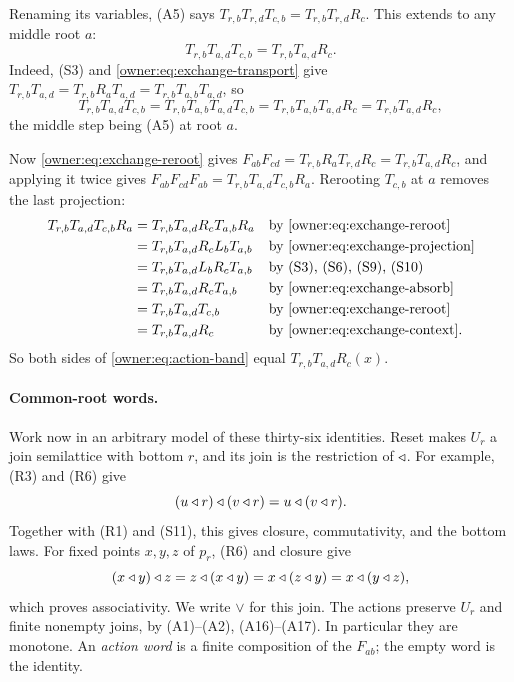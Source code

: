 Renaming its variables, (A5) says $T_{r,b}T_{r,d}T_{c,b}=T_{r,b}T_{r,d}R_c$.
This extends to any middle root $a$:
\begin{equation}\label{owner:eq:exchange-context}
 T_{r,b}T_{a,d}T_{c,b}=T_{r,b}T_{a,d}R_c.
\end{equation}
Indeed, (S3) and \eqref{owner:eq:exchange-transport} give
$T_{r,b}T_{a,d}=T_{r,b}R_aT_{a,d}=T_{r,b}T_{a,b}T_{a,d}$, so
\[
 T_{r,b}T_{a,d}T_{c,b}=T_{r,b}T_{a,b}T_{a,d}T_{c,b}
 =T_{r,b}T_{a,b}T_{a,d}R_c=T_{r,b}T_{a,d}R_c,
\]
the middle step being (A5) at root $a$.

Now \eqref{owner:eq:exchange-reroot} gives
$F_{ab}F_{cd}=T_{r,b}R_aT_{r,d}R_c=T_{r,b}T_{a,d}R_c$, and applying it
twice gives $F_{ab}F_{cd}F_{ab}=T_{r,b}T_{a,d}T_{c,b}R_a$. Rerooting
$T_{c,b}$ at $a$ removes the last projection:
\begin{align*}
 T_{r,b}T_{a,d}T_{c,b}R_a
 &=T_{r,b}T_{a,d}R_cT_{a,b}R_a
  &&\text{by \eqref{owner:eq:exchange-reroot}}\\
 &=T_{r,b}T_{a,d}R_cL_bT_{a,b}
  &&\text{by \eqref{owner:eq:exchange-projection}}\\
 &=T_{r,b}T_{a,d}L_bR_cT_{a,b}
  &&\text{by (S3), (S6), (S9), (S10)}\\
 &=T_{r,b}T_{a,d}R_cT_{a,b}
  &&\text{by \eqref{owner:eq:exchange-absorb}}\\
 &=T_{r,b}T_{a,d}T_{c,b}
  &&\text{by \eqref{owner:eq:exchange-reroot}}\\
 &=T_{r,b}T_{a,d}R_c
  &&\text{by \eqref{owner:eq:exchange-context}}.
\end{align*}
So both sides of \eqref{owner:eq:action-band} equal
$T_{r,b}T_{a,d}R_c(x)$.

\paragraph{Common-root words.}
Work now in an arbitrary model of these thirty-six identities.
Reset makes $U_r$ a join semilattice with bottom $r$, and its join
is the restriction of $\mathbin{\triangleleft}$. For example, (R3) and (R6) give
\[
 (u\mathbin{\triangleleft} r)\mathbin{\triangleleft}(v\mathbin{\triangleleft} r)=u\mathbin{\triangleleft}(v\mathbin{\triangleleft} r).
\]
Together with (R1) and (S11), this gives closure, commutativity,
and the bottom laws. For fixed points $x,y,z$ of $p_r$, (R6)
and closure give
\[
 (x\mathbin{\triangleleft} y)\mathbin{\triangleleft} z
 =z\mathbin{\triangleleft}(x\mathbin{\triangleleft} y)=x\mathbin{\triangleleft}(z\mathbin{\triangleleft} y)=x\mathbin{\triangleleft}(y\mathbin{\triangleleft} z),
\]
which proves associativity. We write $\vee$ for this join.
The actions preserve $U_r$ and finite nonempty joins, by (A1)--(A2),
(A16)--(A17). In particular they are monotone. An \emph{action word}
is a finite composition of the $F_{ab}$; the empty word is the identity.

